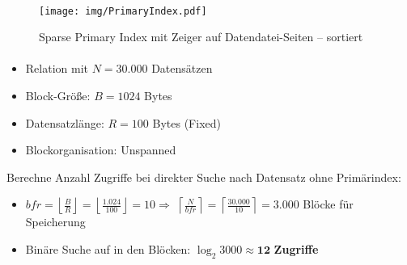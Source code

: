 \begin{frame}{\insertsection}
\framesubtitle{\insertsubsection}
	\begin{figure}
	\texttt{[image: img/PrimaryIndex.pdf]}
	\caption{Sparse Primary Index mit Zeiger auf Datendatei-Seiten -- sortiert}
	\end{figure}
\end{frame}

\begin{frame}{\insertsection}
\framesubtitle{\insertsubsection}
\abs
{}
\abs
{}
\begin{itemize}
	\item Relation mit $N= 30.000$ Datens\"atzen
	\item Block-Gr\"o\ss e: $B = 1024$ Bytes
	\item Datensatzl\"ange: $R = 100$ Bytes (Fixed)
	\item Blockorganisation: Unspanned
\end{itemize}
\abs
\pause
Berechne Anzahl Zugriffe bei direkter Suche nach Datensatz ohne Prim\"arindex:
\begin{itemize}
	\item $bfr=\left \lfloor\frac{B}{R}\right\rfloor = \left \lfloor\frac{1.024}{100}\right\rfloor = 10 \Rightarrow$ 
	$\left\lceil\frac{N}{bfr}\right\rceil = \left\lceil\frac{30.000}{10}\right\rceil = 3.000$ Bl\"ocke für Speicherung
	\item Bin\"are Suche auf in den Bl\"ocken: $\log_2 3000 \approx \mathbf{12}$ \textbf{Zugriffe}
\end{itemize}
\end{frame}


